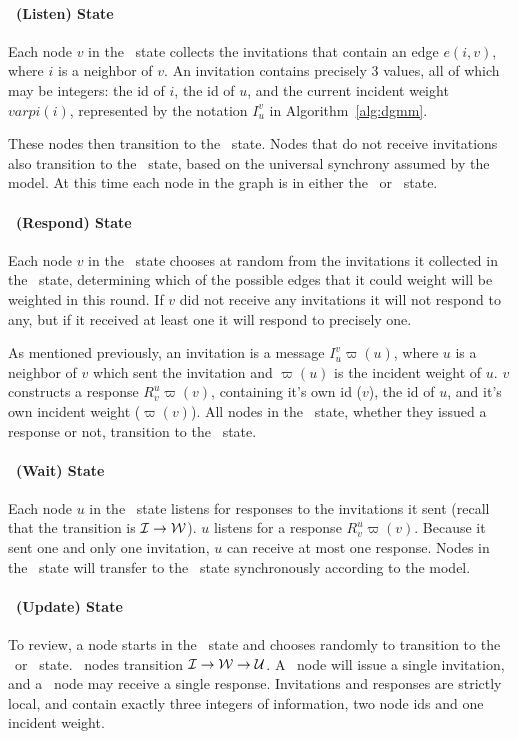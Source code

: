 \paragraph{\cLd\ (Listen) State} 
Each node $v$ in the \cLd\ state collects the invitations that contain an edge $e(i,v)$, where $i$ is a neighbor of $v$. An invitation contains precisely 3 values, all of which may be integers: the id of $i$, the id of $u$, and the current incident weight $varpi(i)$, represented by the notation $I_u^v$ in Algorithm~\ref{alg:dgmm}. 

These nodes then transition to the \cRd\ state. Nodes that do not receive invitations also transition to the \cRd\ state, based on the universal synchrony assumed by the model. At this time each node in the graph is in either the \cRd\ or \cWd\ state. 

\paragraph{\cRd\ (Respond) State}
Each node $v$ in the \cRd\ state chooses at random from the invitations it collected in the \cLd\ state, determining which of the possible edges that it could weight will be weighted in this round. If $v$ did not receive any invitations it will not respond to any, but if it received at least one it will respond to precisely one. 

As mentioned previously, an invitation is a message $I_u^v\varpi(u)$, where $u$ is a neighbor of $v$ which sent the invitation and $\varpi(u)$ is the incident weight of $u$. $v$ constructs a response $R_v^u\varpi(v)$, containing it's own id ($v$), the id of $u$, and it's own incident weight ($\varpi(v)$). All nodes in the \cRd\ state, whether they issued a response or not, transition to the \cUd\ state. 

\paragraph{\cWd\ (Wait) State}
Each node $u$ in the \cWd\ state listens for responses to the invitations it sent (recall that the transition is ${\mathcal I} \rightarrow {\mathcal W}$). $u$ listens for a response $R_v^u\varpi(v)$. Because it sent one and only one invitation, $u$ can receive at most one response. Nodes in the \cWd\ state will transfer to the \cUd\ state synchronously according to the model. 

\paragraph{\cUd\ (Update) State}
To review, a node starts in the \cCd\ state and chooses randomly to transition to the \cId\ or \cLd\ state. \cId\ nodes transition ${\mathcal I} \rightarrow {\mathcal W} \rightarrow {\mathcal U}$. A \cId\ node will issue a single invitation, and a \cWd\ node may receive a single response. Invitations and responses are strictly local, and contain exactly three integers of information, two node ids and one incident weight. 

